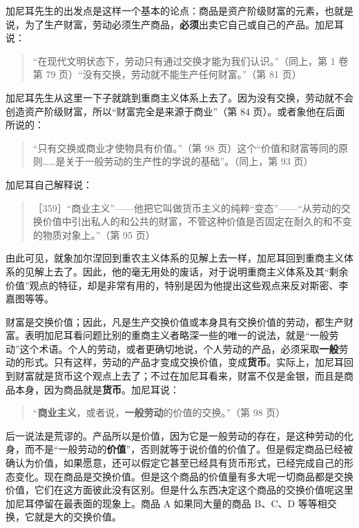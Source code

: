 加尼耳先生的出发点是这样一个基本的论点：商品是资产阶级财富的元素，也就是说，为了生产财富，劳动必须生产商品，\textbf{必须}出卖它自己或自己的产品。加尼耳说：

\begin{quote}“在现代文明状态下，劳动只有通过交换才能为我们认识。”（同上，第 1 卷第 79 页）“没有交换，劳动就不能生产任何财富。”（第 81 页）\end{quote}

加尼耳先生从这里一下子就跳到重商主义体系上去了。因为没有交换，劳动就不会创造资产阶级财富，所以“财富完全是来源于商业”（第 84 页）。或者象他在后面所说的：

\begin{quote}“只有交换或商业才使物具有价值。”（第 98 页）这个“价值和财富等同的原则……是关于一般劳动的生产性的学说的基础”。（同上，第 93 页）\end{quote}

加尼耳自己解释说：

\begin{quote}［359］“商业主义”——他把它叫做货币主义的纯粹“变态”——“从劳动的交换价值中引出私人的和公共的财富，不管这种价值是否固定在耐久的和不变的物质对象上。”（第 95 页）\end{quote}

由此可见，就象加尔涅回到重农主义体系的见解上去一样，加尼耳回到重商主义体系的见解上去了。因此，他的毫无用处的废话，对于说明重商主义体系及其“剩余价值”观点的特征，却是非常有用的，特别是因为他提出这些观点来反对斯密、李嘉图等等。

财富是交换价值；因此，凡是生产交换价值或本身具有交换价值的劳动，都生产财富。表明加尼耳看问题比别的重商主义者略深一些的唯一的说法，就是“一般劳动”这个术语。个人的劳动，或者更确切地说，个人劳动的产品，必须采取\textbf{一般}劳动的形式。只有这样，劳动的产品才变成交换价值，变成\textbf{货币}。实际上，加尼耳回到财富就是货币这个观点上去了；不过在加尼耳看来，财富不仅是金银，而且是商品本身，因为商品就是\textbf{货币}。加尼耳说：

\begin{quote}“\textbf{商业主义}，或者说，\textbf{一般劳动}的价值的交换。”（第 98 页）\end{quote}

后一说法是荒谬的。产品所以是价值，因为它是一般劳动的存在，是这种劳动的化身，而不是“一般劳动的\textbf{价值}”，否则就等于说价值的价值了。但是假定商品已经被确认为价值，如果愿意，还可以假定它甚至已经具有货币形式，已经完成自己的形态变化。现在商品是交换价值。但是这个商品的价值量有多大呢一切商品都是交换价值，它们在这方面彼此没有区别。但是什么东西决定这个商品的交换价值呢这里加尼耳停留在最表面的现象上。商品 A 如果同大量的商品 B、C、D 等等相交换，它就是大的交换价值。

